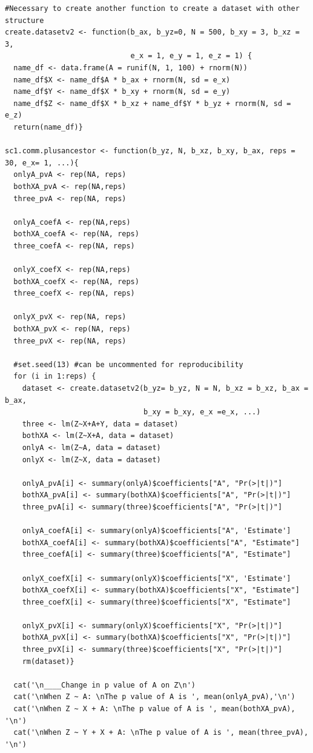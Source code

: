 \documentclass{article}
\begin{document}
\begin{lstlisting}
#Necessary to create another function to create a dataset with other structure
create.datasetv2 <- function(b_ax, b_yz=0, N = 500, b_xy = 3, b_xz = 3,
                             e_x = 1, e_y = 1, e_z = 1) {
  name_df <- data.frame(A = runif(N, 1, 100) + rnorm(N))
  name_df$X <- name_df$A * b_ax + rnorm(N, sd = e_x)
  name_df$Y <- name_df$X * b_xy + rnorm(N, sd = e_y)
  name_df$Z <- name_df$X * b_xz + name_df$Y * b_yz + rnorm(N, sd = e_z)
  return(name_df)}
  
sc1.comm.plusancestor <- function(b_yz, N, b_xz, b_xy, b_ax, reps = 30, e_x= 1, ...){
  onlyA_pvA <- rep(NA, reps)
  bothXA_pvA <- rep(NA,reps)
  three_pvA <- rep(NA, reps)
  
  onlyA_coefA <- rep(NA,reps)
  bothXA_coefA <- rep(NA, reps)
  three_coefA <- rep(NA, reps)
  
  onlyX_coefX <- rep(NA,reps)
  bothXA_coefX <- rep(NA, reps)
  three_coefX <- rep(NA, reps)
  
  onlyX_pvX <- rep(NA, reps)
  bothXA_pvX <- rep(NA, reps)
  three_pvX <- rep(NA, reps)
  
  #set.seed(13) #can be uncommented for reproducibility
  for (i in 1:reps) {
    dataset <- create.datasetv2(b_yz= b_yz, N = N, b_xz = b_xz, b_ax = b_ax,
                                b_xy = b_xy, e_x =e_x, ...)
    three <- lm(Z~X+A+Y, data = dataset)
    bothXA <- lm(Z~X+A, data = dataset)
    onlyA <- lm(Z~A, data = dataset)
    onlyX <- lm(Z~X, data = dataset)
    
    onlyA_pvA[i] <- summary(onlyA)$coefficients["A", "Pr(>|t|)"]
    bothXA_pvA[i] <- summary(bothXA)$coefficients["A", "Pr(>|t|)"]
    three_pvA[i] <- summary(three)$coefficients["A", "Pr(>|t|)"]
    
    onlyA_coefA[i] <- summary(onlyA)$coefficients["A", 'Estimate']
    bothXA_coefA[i] <- summary(bothXA)$coefficients["A", "Estimate"]
    three_coefA[i] <- summary(three)$coefficients["A", "Estimate"]
    
    onlyX_coefX[i] <- summary(onlyX)$coefficients["X", 'Estimate']
    bothXA_coefX[i] <- summary(bothXA)$coefficients["X", "Estimate"]
    three_coefX[i] <- summary(three)$coefficients["X", "Estimate"]
    
    onlyX_pvX[i] <- summary(onlyX)$coefficients["X", "Pr(>|t|)"]
    bothXA_pvX[i] <- summary(bothXA)$coefficients["X", "Pr(>|t|)"]
    three_pvX[i] <- summary(three)$coefficients["X", "Pr(>|t|)"]
    rm(dataset)}
  
  cat('\n____Change in p value of A on Z\n')
  cat('\nWhen Z ~ A: \nThe p value of A is ', mean(onlyA_pvA),'\n')
  cat('\nWhen Z ~ X + A: \nThe p value of A is ', mean(bothXA_pvA), '\n')
  cat('\nWhen Z ~ Y + X + A: \nThe p value of A is ', mean(three_pvA), '\n')


\end{lstlisting}
\end{document}
